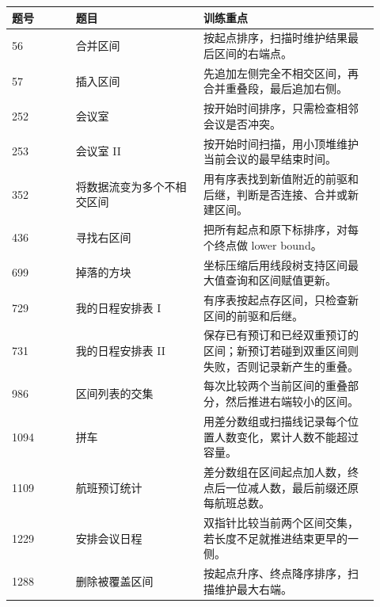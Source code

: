 \begin{longtable}{@{}p{0.16\linewidth}p{0.32\linewidth}p{0.44\linewidth}@{}}
\toprule
题号 & 题目 & 训练重点\\
\midrule
\endhead
56 & 合并区间 & 按起点排序，扫描时维护结果最后区间的右端点。\\
57 & 插入区间 & 先追加左侧完全不相交区间，再合并重叠段，最后追加右侧。\\
252 & 会议室 & 按开始时间排序，只需检查相邻会议是否冲突。\\
253 & 会议室 II & 按开始时间扫描，用小顶堆维护当前会议的最早结束时间。\\
352 & 将数据流变为多个不相交区间 & 用有序表找到新值附近的前驱和后继，判断是否连接、合并或新建区间。\\
436 & 寻找右区间 & 把所有起点和原下标排序，对每个终点做 lower bound。\\
699 & 掉落的方块 & 坐标压缩后用线段树支持区间最大值查询和区间赋值更新。\\
729 & 我的日程安排表 I & 有序表按起点存区间，只检查新区间的前驱和后继。\\
731 & 我的日程安排表 II & 保存已有预订和已经双重预订的区间；新预订若碰到双重区间则失败，否则记录新产生的重叠。\\
986 & 区间列表的交集 & 每次比较两个当前区间的重叠部分，然后推进右端较小的区间。\\
1094 & 拼车 & 用差分数组或扫描线记录每个位置人数变化，累计人数不能超过容量。\\
1109 & 航班预订统计 & 差分数组在区间起点加人数，终点后一位减人数，最后前缀还原每航班总数。\\
1229 & 安排会议日程 & 双指针比较当前两个区间交集，若长度不足就推进结束更早的一侧。\\
1288 & 删除被覆盖区间 & 按起点升序、终点降序排序，扫描维护最大右端。\\
\bottomrule
\end{longtable}


